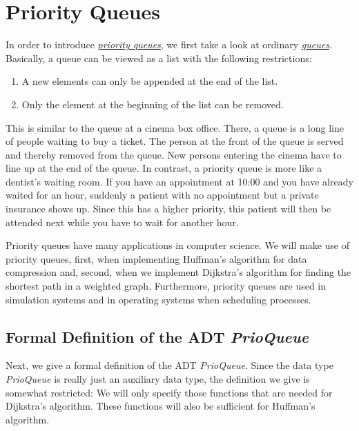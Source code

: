 \chapter{Priority Queues \label{chap:prioqueue}}
In order to introduce \href{https://en.wikipedia.org/wiki/Priority_queue}{\emph{priority queues}},
we first take a look at ordinary
\href{https://en.wikipedia.org/wiki/Queue_(abstract_data_type)}{\emph{queues}}.
Basically, a queue can be viewed as a list with the following restrictions:
\begin{enumerate}
\item A new elements can only be appended at the end of the list.
\item Only the element at the beginning of the list can be removed.
\end{enumerate}
This is similar to the queue at a cinema box office.  There, a queue is a long line of people
waiting to buy a ticket.  The person at the front of the queue is served and thereby removed from
the queue.  New persons entering the cinema have to line up at the end of the queue.  In contrast, a
priority queue is more like a dentist's waiting room.  If you have an appointment at 10:00 and you
have already waited for an hour, suddenly a patient with no appointment but a private insurance
shows up.  Since this has a higher priority, this patient will then be attended next while you have
to wait for another hour. 

Priority queues have many applications in computer science.  We will make use of priority queues,
first, when implementing Huffman's algorithm for data compression and, second, when we implement
Dijkstra's algorithm for finding the shortest path in a weighted graph.  Furthermore, priority
queues are used in simulation systems and in operating systems when scheduling processes.


\section[Formal Definition]{Formal Definition of the ADT \textsl{PrioQueue}}
Next, we give a formal definition of the ADT \textsl{PrioQueue}.  Since the data type
\textsl{PrioQueue} is really just an auxiliary data type, the definition we give is somewhat
restricted: We will only specify those functions that are needed for Dijkstra's algorithm.
These functions will also be sufficient for Huffman's algorithm.

